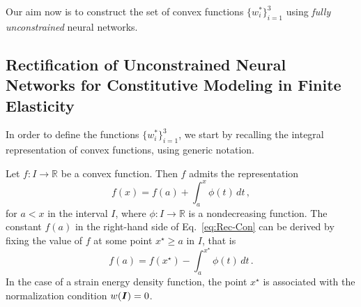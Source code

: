 Our aim now is to construct the set of convex functions $\{w_i^*\}_{i = 1}^3$ using \textit{fully unconstrained} neural networks. %

\subsection{Rectification of Unconstrained Neural Networks for Constitutive Modeling in Finite Elasticity}
\label{subsec:rectification}
In order to define the functions $\{w_i^*\}_{i = 1}^3$, we start by recalling the integral representation of convex functions, using generic notation. 

Let $f:I \to \mathbb{R}$ be a convex function. Then $f$ admits the representation
\begin{equation}\label{eq:Rec-Con}
    f(x) = f(a) + \int_a^x \phi(t)\,dt\,,
\end{equation}
for $a < x$ in the interval $I$, where $\phi:I \to \mathbb{R}$ is a nondecreasing function. The constant $f(a)$ in the right-hand side of Eq.~\eqref{eq:Rec-Con} can be derived by fixing the value of $f$ at some point $x^\star \geq a$ in $I$, that is
\begin{equation}\label{eq:Rec-Con-Value}
    f(a) = f(x^\star) - \int_a^{x^\star} \phi(t)\,dt\,.
\end{equation}
In the case of a strain energy density function, the point $x^\star$ is associated with the normalization condition $w(\boldsymbol{I}) = 0$.

